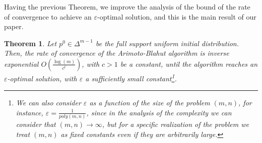 \documentclass[11pt, letterpaper]{article}
\newtheorem{theorem}{Theorem}
\begin{document}
Having the previous Theorem, we improve the analysis of the bound of the rate of convergence to achieve an $\varepsilon$-optimal solution, and this is the main result of our paper.

\begin{theorem}\label{thm:rate of convergence}
Let $p^0 \in \Delta^{m-1}$ be the full support uniform initial distribution. Then, the rate of convergence of the Arimoto-Blahut algorithm is inverse exponential $O\left(\frac{\log(m)}{c^t} \right)$, with $c>1$ be a constant, until the algorithm reaches an $\varepsilon$-optimal solution, with $\varepsilon$ a sufficiently small constant\footnote{We can also consider $\varepsilon$ as a function of the size of the problem $(m,n)$, for instance, $\varepsilon=\frac{1}{poly(m,n)}$, since in the analysis of the complexity we can consider that $(m,n)\to \infty$, but for a specific realization of the problem we treat $(m,n)$ as fixed constants even if they are arbitrarily large.}. 
\end{theorem}
\end{document}
